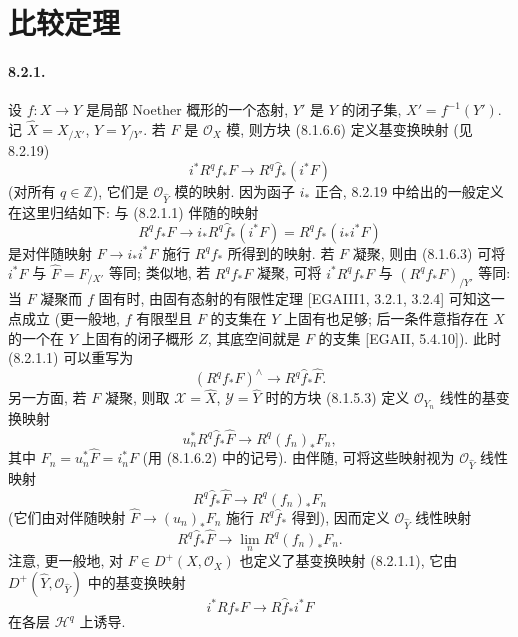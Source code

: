 \section{比较定理}\label{ch08:sec82}
\paragraph{8.2.1.}
设 $f:X\to Y$ 是局部 Noether 概形的一个态射, $Y'$ 是 $Y$ 的闭子集, $X'=f^{-1}(Y')$. 记 $\widehat X=X_{/X'}$, $\widehat Y=Y_{/Y'}$. 若 $F$ 是 $\mathcal O_X$ 模, 则方块 (8.1.6.6) 定义基变换映射 (见 8.2.19)
\begin{equation}i^*R^qf_*F\longrightarrow R^q\widehat f_*(i^*F)\tag{8.2.1.1}\label{ch08:eq8211}\end{equation}
(对所有 $q\in\mathbb Z$), 它们是 $\mathcal O_{\widehat Y}$ 模的映射. 因为函子 $i_*$ 正合, 8.2.19 中给出的一般定义在这里归结如下: 与 (8.2.1.1) 伴随的映射
\[R^qf_*F\longrightarrow i_*R^q\widehat f_*(i^*F)=R^qf_*(i_*i^*F)\]
是对伴随映射 $F\to i_*i^*F$ 施行 $R^qf_*$ 所得到的映射. 若 $F$ 凝聚, 则由 (8.1.6.3) 可将 $i^*F$ 与 $\widehat F=F_{/X'}$ 等同; 类似地, 若 $R^qf_*F$ 凝聚, 可将 $i^*R^qf_*F$ 与 $(R^qf_*F)_{/Y'}$ 等同: 当 $F$ 凝聚而 $f$ 固有时, 由固有态射的有限性定理 [EGAIII1, 3.2.1, 3.2.4] 可知这一点成立 (更一般地, $f$ 有限型且 $F$ 的支集在 $Y$ 上固有也足够; 后一条件意指存在 $X$ 的一个在 $Y$ 上固有的闭子概形 $Z$, 其底空间就是 $F$ 的支集 [EGAII, 5.4.10]). 此时 (8.2.1.1) 可以重写为
\begin{equation}(R^qf_*F)^\wedge\longrightarrow R^q\widehat f_*\widehat F.\tag{8.2.1.2}\label{ch08:eq8212}\end{equation}
另一方面, 若 $F$ 凝聚, 则取 $\mathcal X=\widehat X$, $\mathcal Y=\widehat Y$ 时的方块 (8.1.5.3) 定义 $\mathcal O_{Y_n}$ 线性的基变换映射
\[u_n^*R^q\widehat f_*\widehat F\longrightarrow R^q(f_n)_*F_n,\]
其中 $F_n=u_n^*\widehat F=i_n^*F$ (用 (8.1.6.2) 中的记号). 由伴随, 可将这些映射视为 $\mathcal O_{\widehat Y}$ 线性映射
\[R^q\widehat f_*\widehat F\longrightarrow R^q(f_n)_*F_n\]
(它们由对伴随映射 $\widehat F\to(u_n)_*F_n$ 施行 $R^q\widehat f_*$ 得到), 因而定义 $\mathcal O_{\widehat Y}$ 线性映射
\begin{equation}R^q\widehat f_*\widehat F\longrightarrow\lim_n R^q(f_n)_*F_n.\tag{8.2.1.3}\label{ch08:eq8213}\end{equation}
注意, 更一般地, 对 $F\in D^+(X,\mathcal O_X)$ 也定义了基变换映射 (8.2.1.1), 它由 $D^+(\widehat Y,\mathcal O_{\widehat Y})$ 中的基变换映射
\begin{equation}i^*Rf_*F\longrightarrow R\widehat f_*i^*F\tag{8.2.1.4}\label{ch08:eq8214}\end{equation}
在各层 $\mathcal H^q$ 上诱导.

